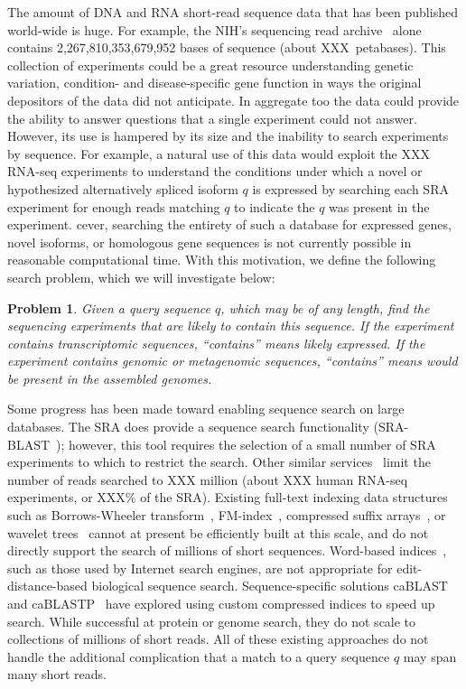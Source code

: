 \documentclass[11pt]{article}
\newtheorem{problem}{Problem}
\begin{document}
The amount of DNA and RNA  short-read sequence data that has been published world-wide is huge. For example, the NIH's sequencing read archive~\cite{sra} alone contains 2,267,810,353,679,952 bases of sequence (about XXX~petabases). This collection of experiments could be a great resource understanding genetic variation, condition- and disease-specific gene function in ways the original depositors of the data did not anticipate. In aggregate too the data could provide the ability to answer questions  that a single experiment could not answer. However, its use is hampered by its size and the inability to search experiments by sequence. For example, a natural use of this data would exploit the XXX RNA-seq experiments to understand the conditions under which a novel or hypothesized alternatively spliced isoform $q$ is expressed by searching each SRA experiment for enough reads matching $q$ to indicate the $q$ was present in the experiment. cever, searching the entirety of such a database for expressed genes, novel isoforms, or homologous gene sequences  is not currently possible in reasonable computational time.  With this motivation, we define  the following search problem, which we will investigate below:
%
\begin{problem}\label{searchprob}
Given a query sequence $q$, which may be of any length, find the sequencing experiments that are likely to contain this sequence. If the experiment contains transcriptomic sequences, ``contains'' means likely expressed. If the experiment contains genomic or metagenomic sequences, ``contains'' means would be present in the assembled genomes.
\end{problem}


Some progress has been made toward enabling sequence search on large databases.  The SRA does provide a sequence search functionality (SRA-BLAST~\cite{srablast}); however, this tool requires the selection of a small number of SRA experiments to which to restrict the search. Other similar services~\cite{othersrablast} limit the number of reads searched to XXX million (about XXX human RNA-seq  experiments, or XXX\% of the SRA). Existing full-text indexing data structures~\cite{fulltextindex} such as Borrows-Wheeler transform~\cite{BWT}, FM-index~\cite{fmindex}, compressed suffix arrays~\cite{comps}, or wavelet trees~\cite{wavelet} cannot at present be efficiently built at this scale, and do not directly support the search of millions of short sequences. Word-based indices~\cite{word1,word2}, such as those used by Internet search engines, are not appropriate for edit-distance-based biological sequence search. Sequence-specific solutions caBLAST~\cite{cablast} and caBLASTP~\cite{cablastp} have explored using custom compressed indices to speed up search. While successful at protein or genome search, they do not scale to collections of millions of short reads. All of these existing approaches do not handle the additional complication that a match to a query sequence $q$ may span many short reads.
\end{document}
